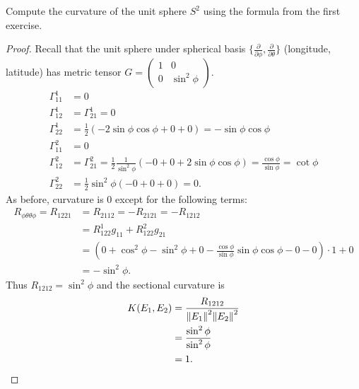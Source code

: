 \documentclass[12pt]{article}
\begin{document}
\begin{problem}[4]
Compute the curvature of the unit sphere $ S^2$ using the formula from the first exercise.
\end{problem}
\begin{proof}
	Recall that the unit sphere under spherical basis $ \{ \frac{\partial }{\partial \phi} , \frac{\partial }{\partial \theta}  \} $ (longitude, latitude) has metric tensor $ G = \begin{pmatrix} 1&0\\0& \sin^2 \phi \end{pmatrix} $.
\begin{align*}
	\Gamma_{ 1 1}^{ 1} &= 0 \\
	\Gamma_{ 1 2}^{ 1} &= \Gamma_{ 2 1}^{ 1} = 0 \\
	\Gamma_{ 2 2}^{ 1} &= \frac{1}{2} \left( - 2 \sin \phi \cos \phi +0+0 \right) = - \sin \phi \cos \phi  \\
	\Gamma_{ 1 1}^{ 2} &= 0 \\
	\Gamma_{ 1 2}^{ 2} &= \Gamma_{ 2 1}^{ 2} = \frac{1}{2} \frac{1}{ \sin^2\phi} \left( -0+0+ 2 \sin \phi \cos \phi \right) = \frac{\cos \phi}{ \sin \phi } =\cot \phi \\
	\Gamma_{ 2 2}^{ 2} &= \frac{1}{2} \sin^2 \phi \left( -0+0+0 \right) =0  .
\end{align*}
As before, curvature is 0 except for the following terms:
\begin{align*}
	R_{\phi \theta \theta \phi} = R_{1221} &= R_{2112} = -R_{2121} = -R_{1212} \\
	&= R_{122}^{1} g_{11} + R_{122}^{2} g_{21} \\
	&= \left( 0+ \cos^2 \phi - \sin^2 \phi +0 - \frac{\cos \phi}{ \sin \phi} \sin \phi \cos \phi - 0 -0  \right) \cdot 1 +0\\
	&= -\sin^2 \phi .
\end{align*}
Thus $ R_{1212} = \sin^2 \phi$ and the sectional curvature is
\begin{align*}
	K(E_1,E_2) &= \frac{R_{1212}}{ {\left\lVert{ E_1}\right\rVert}^2 {\left\lVert{ E_2}\right\rVert}^2   } \\
	&= \frac{ \sin^2 \phi}{ \sin^2 \phi } \\
	&= 1 .
\end{align*}

\end{proof}
\end{document}
